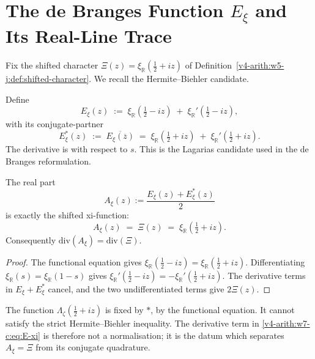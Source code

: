 \section{The de Branges Function \(E_{\xi}\) and Its Real-Line Trace}
\label{v4-arith:w7-c:E-xi}

Fix the shifted character
\(\Xi(z)=\xi_{\mathbb R}(\tfrac{1}{2}+iz)\) of
Definition~\ref{v4-arith:w5-j:def:shifted-character}. We recall the
Hermite--Biehler candidate.

\begin{definition}
\label{v4-arith:w7-c:def:E-xi}
Define
\begin{equation}
\label{v4-arith:w7-c:eq:E-xi}
E_{\xi}(z)\;:=\;\xi_{\mathbb R}\!\left(\tfrac12-iz\right)
\;+\;\xi_{\mathbb R}'\!\left(\tfrac12-iz\right),
\end{equation}
with its conjugate-partner
\begin{equation}
\label{v4-arith:w7-c:eq:E-star-xi}
E_{\xi}^{*}(z)\;:=\;\overline{E_{\xi}(\overline{z})}\;=\;
\xi_{\mathbb R}\!\left(\tfrac12+iz\right)
\;+\;\xi_{\mathbb R}'\!\left(\tfrac12+iz\right).
\end{equation}
The derivative is with respect to \(s\).  This is the Lagarias
candidate used in the de Branges reformulation.
\end{definition}

\begin{lemma}
\label{v4-arith:w7-c:lem:E-Xi-identity}
The real part
\[
A_{\xi}(z):=\frac{E_{\xi}(z)+E_{\xi}^{*}(z)}2
\]
is exactly the shifted xi-function:
\begin{equation}
\label{v4-arith:w7-c:eq:Xi-factor}
A_{\xi}(z)\;=\;\Xi(z)
\;=\;\xi_{\mathbb R}\!\left(\tfrac12+iz\right).
\end{equation}
Consequently \(\mathrm{div}(A_{\xi})=\mathrm{div}(\Xi)\).
\end{lemma}

\begin{proof}
The functional equation gives
\(\xi_{\mathbb R}(\tfrac12-iz)=\xi_{\mathbb R}(\tfrac12+iz)\).
Differentiating \(\xi_{\mathbb R}(s)=\xi_{\mathbb R}(1-s)\) gives
\(\xi_{\mathbb R}'(\tfrac12-iz)=-\xi_{\mathbb R}'(\tfrac12+iz)\).
The derivative terms in \(E_{\xi}+E_{\xi}^{*}\) cancel, and the two
undifferentiated terms give \(2\Xi(z)\).
\end{proof}

\begin{remark}
\label{v4-arith:w7-c:rem:prefactor}
The function \(\Lambda_{\zeta}(\tfrac12+iz)\) is fixed by
\(*\), by the functional equation.  It cannot satisfy the strict
Hermite--Biehler inequality.  The derivative term in
\eqref{v4-arith:w7-c:eq:E-xi} is therefore not a normalisation; it is
the datum which separates \(A_{\xi}=\Xi\) from its conjugate
quadrature.
\end{remark}

